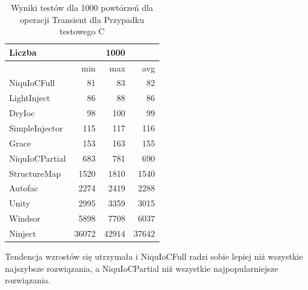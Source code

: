 \documentclass[12pt]{article}
\begin{document}
\begin{table}[H]
\captionsetup{belowskip=0pt,aboveskip=0pt}
\begin{center}
\begin{small}
	\begin{tabular}{ | l | r r r | }
    		\hline
Liczba & & 1000 & \\ \hline
 & min & max & avg \\ \hline
NiquIoCFull & 81 & 83 & 82 \\ \hline
LightInject & 86 & 88 & 86 \\ \hline
DryIoc & 98 & 100 & 99 \\ \hline
SimpleInjector & 115 & 117 & 116 \\ \hline
Grace & 153 & 163 & 155 \\ \hline
NiquIoCPartial & 683 & 781 & 690 \\ \hline
StructureMap & 1520 & 1810 & 1540 \\ \hline
Autofac & 2274 & 2419 & 2288 \\ \hline
Unity & 2995 & 3359 & 3015 \\ \hline
Windsor & 5898 & 7708 & 6037 \\ \hline
Ninject & 36072 & 42914 & 37642 \\ \hline
  	\end{tabular}
\end{small}
\end{center}
\caption{Wyniki testów dla 1000 powtórzeń dla operacji Transient dla Przypadku testowego C}
\label{TestCaseC_Transient1000}
\end{table}
Tendencja wzrostów się utrzymała i NiquIoCFull radzi sobie lepiej niż wszystkie najszybsze rozwiązania, a NiquIoCPartial niż wszystkie najpopularniejsze rozwiązania.
\end{document}
